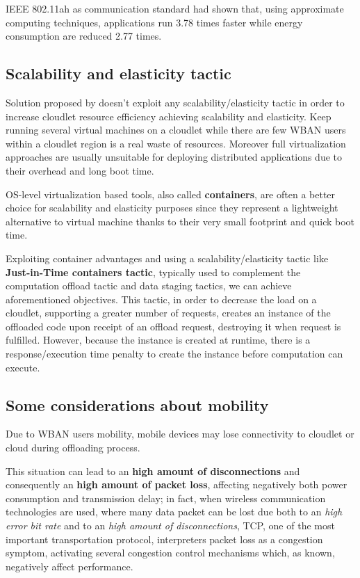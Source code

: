 \documentclass[10pt]{beamer}
\begin{document}
\begin{frame}{IEEE 802.11ah as communication standard}
\citet{ApproximateComputingArticle} had shown that, using approximate computing techniques, applications run 3.78 times faster while energy consumption are reduced 2.77 times.

\subsection{Scalability and elasticity tactic}

Solution proposed by \citet{MSAReport} doesn't exploit any scalability/elasticity tactic in order to increase cloudlet resource efficiency achieving scalability and elasticity. Keep running several virtual machines on a cloudlet while there are few WBAN users within a cloudlet region is a real waste of resources. Moreover full virtualization approaches are usually unsuitable for deploying distributed applications due to their overhead and long boot time.

OS-level virtualization based tools, also called \textbf{containers}, are often a better choice for scalability and elasticity purposes since they represent a lightweight alternative to virtual machine thanks to their very small footprint and quick boot time. 

Exploiting container advantages and using a scalability/elasticity tactic like \textbf{Just-in-Time containers tactic}, typically used to complement the computation offload tactic and data staging tactics, we can achieve aforementioned objectives. This tactic, in order to decrease the load on a cloudlet, supporting a greater number of requests, creates an instance of the offloaded code upon receipt of an offload request, destroying it when request is fulfilled. However, because the instance is created at runtime, there is a response/execution time penalty to create the instance before computation can execute.\cite{DecisionModel}\cite{ArchitecturalTacticsCyberForaging}

\subsection{Some considerations about mobility}

Due to WBAN users mobility, mobile devices may lose connectivity to cloudlet or cloud during offloading process. 

This situation can lead to an \textbf{high amount of disconnections} and consequently an \textbf{high amount of packet loss}, affecting negatively both power consumption and transmission delay; in fact, when wireless communication technologies are used, where many data packet can be lost due both to an \textit{high error bit rate} and to an \textit{high amount of disconnections}, TCP, one of the most important transportation protocol, interpreters packet loss as a congestion symptom, activating several congestion control mechanisms which, as known, negatively affect performance.\cite{tcp}


\end{frame}
\end{document}
